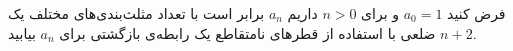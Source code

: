 \EXERCISE
فرض کنید
$a_0 = 1$
و برای
$n > 0$
داریم
$a_n$
برابر است با تعداد مثلث‌بندی‌های مختلف یک
$n + 2$
ضلعی با استفاده از قطرهای نامتقاطع یک رابطه‌ی بازگشتی برای
$a_n$
بیابید.